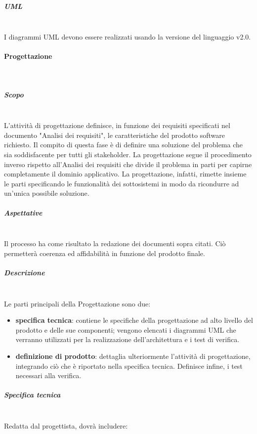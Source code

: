 			\subparagraph{UML} \mbox{}\\
			I diagrammi UML devono essere realizzati usando la versione del linguaggio v2.0.

		\paragraph{Progettazione} \mbox{}\\
			\subparagraph{Scopo} \mbox{}\\
			L'attività di progettazione definisce, in funzione dei requisiti specificati nel documento "Analisi dei requisiti", le caratteristiche del prodotto software richiesto. Il compito di questa fase è di definire una soluzione del problema che sia soddisfacente per tutti gli stakeholder. La progettazione segue il procedimento inverso rispetto all'Analisi dei requisiti che divide il problema in parti per capirne completamente il dominio applicativo. La progettazione, infatti, rimette insieme le parti specificando le funzionalità dei sottosistemi in modo da ricondurre ad un'unica possibile soluzione.
			\subparagraph{Aspettative} \mbox{}\\
			Il processo ha come risultato la redazione dei documenti sopra citati. Ciò permetterà
			coerenza ed affidabilità in funzione del prodotto finale.
			\subparagraph{Descrizione} \mbox{}\\
			Le parti principali della Progettazione sono due:
			\begin{itemize}
				\item \textbf{specifica tecnica}: contiene le specifiche della progettazione ad alto livello del prodotto e delle sue componenti; vengono elencati i diagrammi UML che verranno utilizzati per la realizzazione dell'architettura e i test di verifica.
				\item \textbf{definizione di prodotto}: dettaglia ulteriormente l'attività di progettazione, integrando ciò che è riportato nella specifica tecnica. Definisce infine, i test necessari alla verifica.
			\end{itemize}
			\subparagraph{Specifica tecnica} \mbox{}\\
			Redatta dal progettista, dovrà includere:
